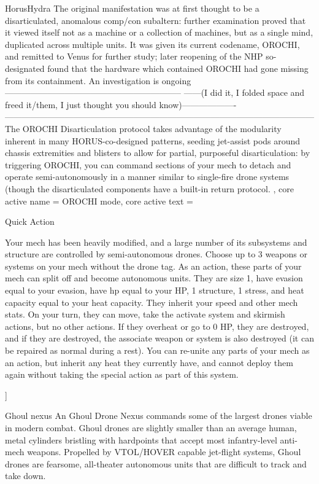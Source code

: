 \begin{mech}{Horus}{Hydra}
{The original manifestation was at first thought to be a disarticulated, anomalous comp/con subaltern: further examination proved that it viewed itself not as a machine or a collection of machines, but as a single mind, duplicated across multiple units. It was given its current codename, OROCHI, and remitted to Venus for further study; later reopening of the NHP so-designated found that the hardware which contained OROCHI had gone missing from its containment. An investigation is ongoing--------------------------------------------------------------
------(I did it, I folded space and freed it/them, I just thought you should know)-------------------
------------------------------------------------------------------------------------------------------------
The OROCHI Disarticulation protocol takes advantage of the modularity inherent in many HORUS-co-designed patterns, seeding jet-assist pods around chassis extremities and blisters to allow for partial, purposeful disarticulation: by triggering OROCHI, you can command sections of your mech to detach and operate semi-autonomously in a manner similar to single-fire drone systems (though the disarticulated components have a built-in return protocol.
},
core active name = OROCHI mode,
core active text = {Quick Action

Your mech has been heavily modified, and a large number of its subsystems and structure are controlled by semi-autonomous drones. Choose up to 3 weapons or systems on your mech without the drone tag. As an action, these parts of your mech can split off and become autonomous units. They are size 1, have evasion equal to your evasion, have hp equal to your HP, 1 structure, 1 stress, and heat capacity equal to your heat capacity. They inherit your speed and other mech stats. On your turn, they can move, take the activate system and skirmish actions, but no other actions. If they overheat or go to 0 HP, they are destroyed, and if they are destroyed, the associate weapon or system is also destroyed (it can be repaired as normal during a rest). You can re-unite any parts of your mech as an action, but inherit any heat they currently have, and cannot deploy them again without taking the special action as part of this system.
}]


Ghoul nexus
An Ghoul Drone Nexus commands some of the largest drones viable in modern combat. Ghoul drones are slightly smaller than an average human, metal cylinders bristling with hardpoints that accept most infantry-level anti-mech weapons. Propelled by VTOL/HOVER capable jet-flight systems, Ghoul drones are fearsome, all-theater autonomous units that are difficult to track and take down.


\end{mech}
